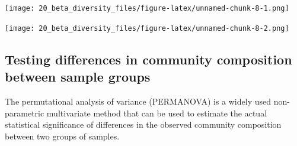\documentclass[
]{book}
\newenvironment{Shaded}{\begin{snugshade}}{\end{snugshade}}
\newcommand{\AttributeTok}[1]{\textcolor[rgb]{0.77,0.63,0.00}{#1}}
\newcommand{\ConstantTok}[1]{\textcolor[rgb]{0.00,0.00,0.00}{#1}}
\newcommand{\DecValTok}[1]{\textcolor[rgb]{0.00,0.00,0.81}{#1}}
\newcommand{\FunctionTok}[1]{\textcolor[rgb]{0.00,0.00,0.00}{#1}}
\newcommand{\NormalTok}[1]{#1}
\newcommand{\SpecialCharTok}[1]{\textcolor[rgb]{0.00,0.00,0.00}{#1}}
\newcommand{\StringTok}[1]{\textcolor[rgb]{0.31,0.60,0.02}{#1}}
\begin{document}
\texttt{[image: 20\_beta\_diversity\_files/figure-latex/unnamed-chunk-8-1.png]}

\begin{Shaded}
\end{Shaded}

\texttt{[image: 20\_beta\_diversity\_files/figure-latex/unnamed-chunk-8-2.png]}

\hypertarget{testing-differences-in-community-composition-between-sample-groups}{%
\subsection{Testing differences in community composition between sample groups}\label{testing-differences-in-community-composition-between-sample-groups}}

The permutational analysis of variance (PERMANOVA) \citep{Anderson2001} is
a widely used non-parametric multivariate method that can be used to
estimate the actual statistical significance of differences in the
observed community composition between two groups of
samples.
\end{document}
